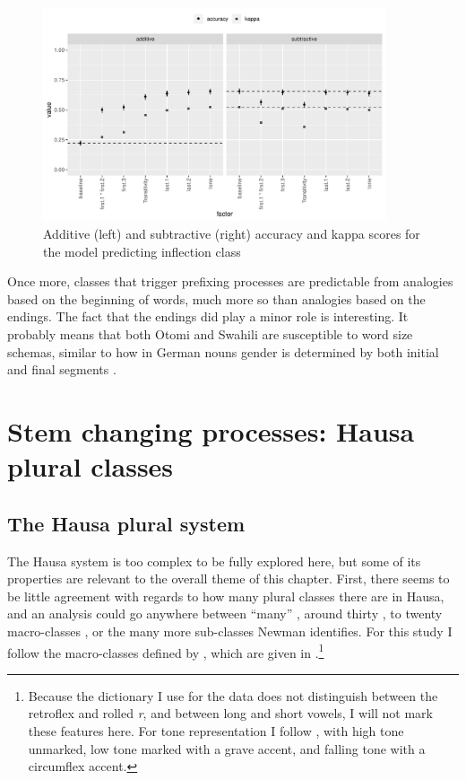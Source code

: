 \begin{figure}
  \centering
  \includegraphics[width=0.9\textwidth]{./figures/otomi/fact-imp.pdf}
  \caption{Additive (left) and subtractive (right) accuracy and kappa scores for the model predicting inflection class}\label{fig:fact-imp-otomi}
\end{figure}

Once more, classes that trigger prefixing processes are predictable from analogies based on the beginning of words, much more so than analogies based on the endings. The fact that the endings did play a minor role is interesting. It probably means that both Otomi and Swahili are susceptible to word size schemas, similar to how in German nouns gender is determined by both initial and final segments \autocite{Kopcke.1984}.%


\section{Stem changing processes: Hausa plural classes}


\subsection{The Hausa plural system}

The Hausa  system is too complex to be fully explored here, but some of its properties are relevant to the overall theme of this chapter. First, there seems to be little agreement with regards to how many plural classes there are in Hausa, and an analysis could go anywhere between ``many'' \autocite{Migeod.1914}, around thirty \autocite{Schon.1862}, to twenty macro-classes \autocite{Newman.2000}, or the many more sub-classes Newman identifies. For this study I follow the macro-classes defined by \textcite{Newman.2000}, which are given in .\footnote{Because the dictionary I use for the data \autocite{Bargery.1951} does not distinguish between the retroflex and rolled \textit{r}, and between long and short vowels, I will not mark these features here. For tone representation I follow \textcite{Newman.2000}, with high tone unmarked, low tone marked with a grave accent, and falling tone with a circumflex accent.}


